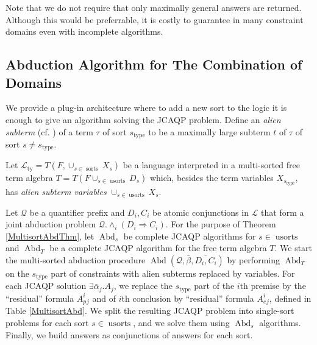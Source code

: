 \documentclass{article}
\newcommand{\tmem}[1]{{\em #1\/}}
\newcommand{\tmop}[1]{\ensuremath{\operatorname{#1}}}
\begin{document}
Note that we do not require that only maximally general answers are returned.
Although this would be preferrable, it is costly to guarantee in many
constraint domains even with incomplete algorithms.

\subsection{Abduction Algorithm for The Combination of
Domains}\label{JCAAlienMain}

We provide a plug-in architecture where to add a new sort to the logic it is
enough to give an algorithm solving the JCAQP problem. Define an {\tmem{alien
subterm}} (cf. {\cite{UnificationBaader}}) of a term $\tau$ of sort
$s_{\tmop{type}}$ to be a maximally large subterm $t$ of $\tau$ of sort $s
\neq s_{\tmop{type}}$.

Let $\mathcal{L}_{\tmop{ty}} = T (F, \cup_{s \in \tmop{sorts}} X_s)$ be a
language interpreted in a multi-sorted free term algebra $T = T (F \cup_{s \in
\tmop{usorts}} D_s)$ which, besides the term variables $X_{s_{\tmop{type}}}$,
has {\tmem{alien subterm variables}} $\cup_{s \in \tmop{usorts}} X_s$.

Let $\mathcal{Q}$ be a quantifier prefix and $D_i, C_i$ be atomic conjunctions
in $\mathcal{L}$ that form a joint abduction problem $\mathcal{Q}. \wedge_i
(D_i \Rightarrow C_i)$. For the purpose of Theorem \ref{MultisortAbdThm}, let
$\tmop{Abd}_s$ be complete JCAQP algorithms for $s \in \tmop{usorts}$ and
$\tmop{Abd}_T$ be a complete JCAQP algorithm for the free term algebra $T$. We
start the multi-sorted abduction procedure $\tmop{Abd} (\mathcal{Q},
\bar{\beta}, \overline{D_i, C_i})$ by performing $\tmop{Abd}_T$ on the
$s_{\tmop{type}}$ part of constraints with alien subterms replaced by
variables. For each JCAQP solution $\exists \bar{\alpha}_j .A_j$, we replace
the $s_{\tmop{type}}$ part of the $i$th premise by the ``residual'' formula
$A_p^i_j$ and of $i$th conclusion by ``residual'' formula $A_c^i_j$, defined
in Table \ref{MultisortAbd}. We split the resulting JCAQP problem into
single-sort problems for each sort $s \in \tmop{usorts}$, and we solve them
using $\tmop{Abd}_s$ algorithms. Finally, we build answers as conjunctions of
answers for each sort.
\end{document}
